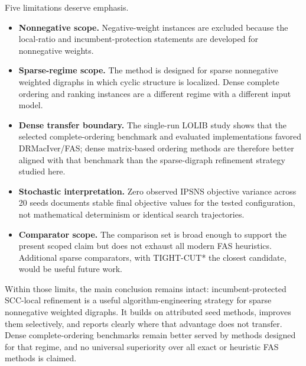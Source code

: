 Five limitations deserve emphasis.
\begin{itemize}
    \item \textbf{Nonnegative scope.} Negative-weight instances are excluded because the local-ratio and incumbent-protection statements are developed for nonnegative weights.
    \item \textbf{Sparse-regime scope.} The method is designed for sparse nonnegative weighted digraphs in which cyclic structure is localized. Dense complete ordering and ranking instances are a different regime with a different input model.
    \item \textbf{Dense transfer boundary.} The single-run LOLIB study shows that the selected complete-ordering benchmark and evaluated implementations favored DRMacIver/FAS; dense matrix-based ordering methods are therefore better aligned with that benchmark than the sparse-digraph refinement strategy studied here.
    \item \textbf{Stochastic interpretation.} Zero observed IPSNS objective variance across 20 seeds documents stable final objective values for the tested configuration, not mathematical determinism or identical search trajectories.
    \item \textbf{Comparator scope.} The comparison set is broad enough to support the present scoped claim but does not exhaust all modern FAS heuristics. Additional sparse comparators, with TIGHT-CUT* the closest candidate, would be useful future work.
\end{itemize}

Within those limits, the main conclusion remains intact: incumbent-protected SCC-local refinement is a useful algorithm-engineering strategy for sparse nonnegative weighted digraphs. It builds on attributed seed methods, improves them selectively, and reports clearly where that advantage does not transfer. Dense complete-ordering benchmarks remain better served by methods designed for that regime, and no universal superiority over all exact or heuristic FAS methods is claimed.

